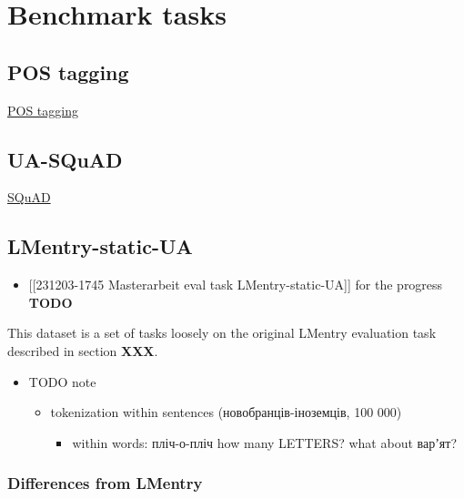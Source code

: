 \section{Benchmark tasks}\label{benchmark-tasks}

\subsection{POS tagging}\label{pos-tagging}

\href{https://github.com/fido-ai/ua-datasets/tree/main/ua_datasets/src/token_classification}{POS
tagging}

\subsection{UA-SQuAD}\label{ua-squad}

\href{https://github.com/fido-ai/ua-datasets/tree/main/ua_datasets/src/question_answering}{SQuAD}

\subsection{LMentry-static-UA}\label{lmentry-static-ua-1}

\begin{itemize}
\tightlist
\item
  {[}{[}231203-1745 Masterarbeit eval task LMentry-static-UA{]}{]} for
  the progress \textbf{TODO}
\end{itemize}

This dataset is a set of tasks loosely on the original LMentry
evaluation task\cite{bm_lmentry} described in section \textbf{XXX}.

\begin{itemize}
\tightlist
\item
  TODO note

  \begin{itemize}
  \tightlist
  \item
    tokenization within sentences (новобранців-іноземців, 100 000)

    \begin{itemize}
    \tightlist
    \item
      within words: пліч-о-пліч how many LETTERS? what about варʼят?
    \end{itemize}
  \end{itemize}
\end{itemize}

\subsubsection{Differences from LMentry}\label{differences-from-lmentry}

